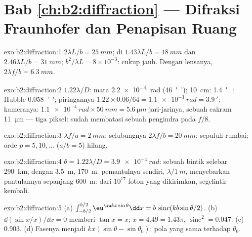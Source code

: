 \section*{Bab \ref{ch:b2:diffraction} --- Difraksi Fraunhofer dan Penapisan Ruang}

\begin{solution}{exo:b2:diffraction:1}
$2\lambda L/b = \qty{25}{mm}$;  di $1.43\lambda L/b = \qty{18}{mm}$ dan
$2.46\lambda L/b = \qty{31}{mm}$;  $b^2/\lambda L = 8 \times 10^{-3}$: cukup
jauh. Dengan lensanya, $2\lambda f/b = \qty{6.3}{mm}$.
\end{solution}

\begin{solution}{exo:b2:diffraction:2}
$1.22\lambda/D$: mata \qty{2.2e-4}{rad} (\qty{46}{''}); \qty{10}{cm}: \qty{1.4}{''}; Hubble
\qty{0.058}{''}; piringannya $1.22 \times 0.06/64 = \qty{1.1e-3}{rad} = \qty{3.9}{'}$; kameranya:
$\qty{1.1e-4}{rad} \times \qty{50}{mm} = \qty{5.6}{\micro m}$ jari-jarinya, sebuah cakram \qty{11}{\micro m} ---
tiga piksel:  sudah membatasi sebuah pengindra pada $f/8$.
\end{solution}

\begin{solution}{exo:b2:diffraction:3}
$\lambda f/a = \qty{2}{mm}$; selubungnya $2\lambda f/b = \qty{20}{mm}$; sepuluh rumbai; orde
$p = 5, 10, \dots$ ($a/b = 5$) hilang.
\end{solution}

\begin{solution}{exo:b2:diffraction:4}
$\theta = 1.22\lambda/D = \qty{3.9e-4}{rad}$: sebuah bintik selebar \qty{290}{km}; dengan \qty{3.5}{m},
\qty{170}{m}.  pemantulnya sendiri, $\lambda/\qty{1}{m}$, menyebarkan
pantulannya sepanjang \qty{600}{m}: dari $10^{17}$ foton yang dikirimkan, segelintir kembali.
\end{solution}

\begin{solution}{exo:b2:diffraction:5}
(a) $\int_{-b/2}^{b/2}\eu^{\iu kx\sin\theta}\dd x = b\,\operatorname{sinc}(kb\sin\theta/2)$. (b)
$\dd(\sin x/x)/\dd x = 0$ memberi $\tan x = x$; $x = 4.49 = 1.43\pi$, $\operatorname{sinc}^2 =
0.047$. (c) $0.903$. (d) Fasenya menjadi $kx(\sin\theta - \sin\theta_0)$: pola
yang sama terhadap $\theta_0$.
\end{solution}

